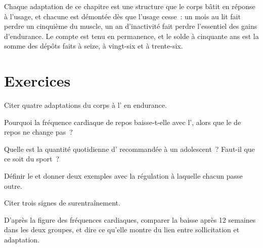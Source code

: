 \begin{remark}\label{rem:g10:sport-and-health:account}
Chaque adaptation de ce chapitre est une structure que le corps bâtit
en réponse à l'usage, et chacune est démontée dès que l'usage cesse~:
un mois au lit fait perdre un cinquième du muscle, un an d'inactivité
fait perdre l'essentiel des gains d'endurance. Le compte est tenu en
permanence, et le solde à cinquante ans est la somme des dépôts faits à
seize, à vingt-six et à trente-six.
\end{remark}

\section{Exercices}

\begin{exercise}[$\star$]\label{exo:g10:sport-and-health:1}
Citer quatre adaptations du corps à l' en endurance.
\end{exercise}

\begin{exercise}[$\star$]\label{exo:g10:sport-and-health:2}
Pourquoi la fréquence cardiaque de repos baisse-t-elle avec
l', alors que le  de repos ne change pas~?
\end{exercise}

\begin{exercise}[$\star$]\label{exo:g10:sport-and-health:3}
Quelle est la quantité quotidienne d' recommandée à un
adolescent~? Faut-il que ce soit du sport~?
\end{exercise}

\begin{exercise}[$\star$]\label{exo:g10:sport-and-health:4}
Définir le  et donner deux exemples avec la régulation à laquelle
chacun passe outre.
\end{exercise}

\begin{exercise}[$\star$]\label{exo:g10:sport-and-health:5}
Citer trois signes de surentraînement.
\end{exercise}

\begin{exercise}[$\star\star$]\label{exo:g10:sport-and-health:6}
D'après la figure des fréquences cardiaques, comparer la baisse après
12 semaines dans les deux groupes, et dire ce qu'elle montre du lien
entre sollicitation et adaptation.
\end{exercise}

